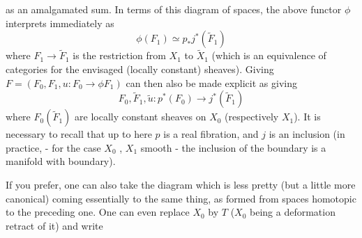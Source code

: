 
as an amalgamated sum.  In terms of this diagram of spaces,
the above functor $\phi$ interprets immediately as
\[ \phi(F_1) \simeq p_* j^*(\tilde{F}_1) \]
where $F_1 \to \tilde{F}_1$ is the restriction from $X_1$ to $\tilde{X}_1$ (which is
an equivalence of categories for the envisaged (locally constant)
sheaves).  Giving $F = (F_0 , F_1 , u : F_0 \to \phi F_1)$ can then also
be made explicit as giving
\[ F_0 , \tilde{F}_1 , \tilde{u} : p^*(F_0) \to j^*(\tilde{F}_1) \]
where $F_0(\tilde{F}_1)$ are locally constant sheaves on $X_0$ (respectively
$X_1$).  It is necessary to recall that up to here $p$ is a real
fibration, and $j$ is an inclusion (in practice, - for the case
$X_0$ , $X_1$ smooth - the inclusion of the boundary is a manifold
with boundary).

If you prefer, one can also take the diagram which is less
pretty (but a little more canonical)
coming essentially to the same thing, as formed from spaces
homotopic to the preceding one.  One can even replace $X_0$ by $T$
($X_0$ being a deformation retract of it) and write

